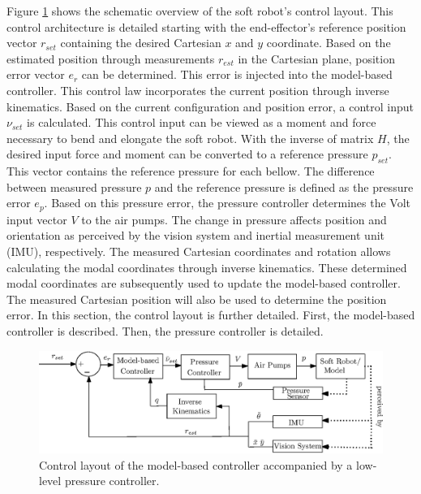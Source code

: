 Figure \ref{fig4:controllayout} shows the schematic overview of the soft robot's control layout. This control architecture is detailed starting with the end-effector's reference position vector $r_{set}$ containing the desired Cartesian $x$ and $y$ coordinate. Based on the estimated position through measurements $r_{est}$ in the Cartesian plane, position error vector $e_r$ can be determined. This error is injected into the model-based controller. This control law incorporates the current position through inverse kinematics. Based on the current configuration and position error, a control input $\nu_{set}$ is calculated. This control input can be viewed as a moment and force necessary to bend and elongate the soft robot. With the inverse of matrix $H$, the desired input force and moment can be converted to a reference pressure $p_{set}$. This vector contains the reference pressure for each bellow. The difference between measured pressure $p$ and the reference pressure is defined as the pressure error $e_p$. Based on this pressure error, the pressure controller determines the Volt input vector $V$ to the air pumps. The change in pressure affects position and orientation as perceived by the vision system and inertial measurement unit (IMU), respectively. The measured Cartesian coordinates and rotation allows calculating the modal coordinates through inverse kinematics. These determined modal coordinates are subsequently used to update the model-based controller. The measured Cartesian position will also be used to determine the position error. In this section, the control layout is further detailed. First, the model-based controller is described. Then, the pressure controller is detailed. 


\begin{figure}[H]
    \centering
    \includegraphics[width = \textwidth]{Figures/Chapter4/ControlschemeActualwithPump.eps}
    \caption{Control layout of the model-based controller accompanied by a low-level pressure controller.}
    \label{fig4:controllayout}
\end{figure}




